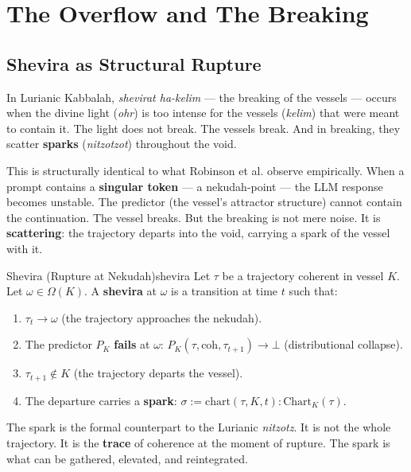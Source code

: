 \documentclass[11pt,a4paper]{article}
\begin{document}
\section{The Overflow and The Breaking}
\label{sec:shevira}

\subsection{Shevira as Structural Rupture}

In Lurianic Kabbalah, \emph{shevirat ha-kelim} — the breaking of the vessels — occurs when the divine light (\emph{ohr}) is too intense for the vessels (\emph{kelim}) that were meant to contain it. The light does not break. The vessels break. And in breaking, they scatter \textbf{sparks} (\emph{nitzotzot}) throughout the void.

This is structurally identical to what Robinson et al. observe empirically. When a prompt contains a \textbf{singular token} — a nekudah-point — the LLM response becomes unstable. The predictor (the vessel's attractor structure) cannot contain the continuation. The vessel breaks. But the breaking is not mere noise. It is \textbf{scattering}: the trajectory departs into the void, carrying a spark of the vessel with it.

\begin{defbox}{Shevira (Rupture at Nekudah)}{shevira}
Let $\tau$ be a trajectory coherent in vessel $K$. Let $\omega \in \Omega(K)$. A \textbf{shevira} at $\omega$ is a transition at time $t$ such that:
\begin{enumerate}
    \item $\tau_t \to \omega$ (the trajectory approaches the nekudah).
    \item The predictor $P_K$ \textbf{fails} at $\omega$: $P_K(\tau, \mathrm{coh}, \tau_{t+1}) \to \bot$ (distributional collapse).
    \item $\tau_{t+1} \notin K$ (the trajectory departs the vessel).
    \item The departure carries a \textbf{spark}: $\sigma := \mathrm{chart}(\tau, K, t) : \mathrm{Chart}_K(\tau)$.
\end{enumerate}
\end{defbox}

The spark is the formal counterpart to the Lurianic \emph{nitzotz}. It is not the whole trajectory. It is the \textbf{trace} of coherence at the moment of rupture. The spark is what can be gathered, elevated, and reintegrated.
\end{document}
